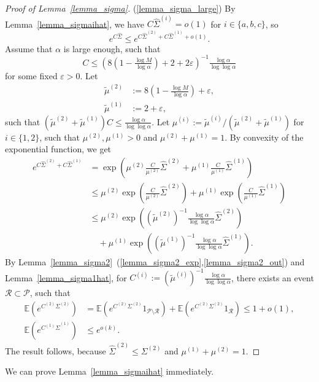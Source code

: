 \documentclass{article}
\theoremstyle{plain}
\theoremstyle{remark}
\theoremstyle{plain}
\numberwithin{equation}{section}
\begin{document}
\begin{proof}[Proof of Lemma~\ref{lemma_sigma}]
		(\ref{lemma_sigma_large}) By Lemma~\ref{lemma_sigmaihat}, we have $C\hat{\Sigma}^{(i)}=o(1)$ for $i\in\{a,b,c\}$, so $$e^{C\hat{\Sigma}}\leq e^{C\hat{\Sigma}^{(2)}+C\hat{\Sigma}^{(1)}+o(1)}.$$ Assume that $\alpha$ is large enough, such that $$C\leq\left(8\left(1-\tfrac{\log M}{\log\alpha}\right)+2+2\varepsilon\right)^{-1}\tfrac{\log\alpha}{\log\log\alpha}$$ for some fixed $\varepsilon>0$. Let
		\begin{align}
			\widetilde{\mu}^{(2)}&:=8\left(1-\tfrac{\log M}{\log\alpha}\right)+\varepsilon,
			\\\widetilde{\mu}^{(1)}&:=2+\varepsilon,
		\end{align}
		such that $(\widetilde{\mu}^{(2)}+\widetilde{\mu}^{(1)})C\leq\tfrac{\log\alpha}{\log\log\alpha}$. Let $\mu^{(i)}:=\widetilde{\mu}^{(i)}/(\widetilde{\mu}^{(2)}+\widetilde{\mu}^{(1)})$ for $i\in\{1,2\}$, such that $\mu^{(2)},\mu^{(1)}>0$ and $\mu^{(2)}+\mu^{(1)}=1$. By convexity of the exponential function, we get
		\begin{align}
			e^{C\hat{\Sigma}^{(2)}+C\hat{\Sigma}^{(1)}}
			&=\exp\left(\mu^{(2)}\tfrac{C}{\mu^{(2)}}\hat{\Sigma}^{(2)}+\mu^{(1)}\tfrac{C}{\mu^{(1)}}\hat{\Sigma}^{(1)}\right)
			\\&\leq\mu^{(2)}\exp\left(\tfrac{C}{\mu^{(2)}}\hat{\Sigma}^{(2)}\right)+\mu^{(1)}\exp\left(\tfrac{C}{\mu^{(1)}}\hat{\Sigma}^{(1)}\right)
			\\&\leq\mu^{(2)}\exp\left((\widetilde{\mu}^{(2)})^{-1}\tfrac{\log\alpha}{\log\log\alpha}\hat{\Sigma}^{(2)}\right)
			\\&\quad+\mu^{(1)}\exp\left((\widetilde{\mu}^{(1)})^{-1}\tfrac{\log\alpha}{\log\log\alpha}\hat{\Sigma}^{(1)}\right).
		\end{align}
		By Lemma~\ref{lemma_sigma2}~(\ref{lemma_sigma2_exp},\ref{lemma_sigma2_out}) and Lemma~\ref{lemma_sigma1hat}, for $C^{(i)}:=(\widetilde{\mu}^{(i)})^{-1}\tfrac{\log\alpha}{\log\log\alpha}$, there exists an event $\mathcal{R}\subset\mathcal{P}$, such that
		\begin{align}
			\mathbb{E}(e^{C^{(2)}\Sigma^{(2)}})&=\mathbb{E}(e^{C^{(2)}\Sigma^{(2)}}1_{\mathcal{P}\setminus\mathcal{R}})+\mathbb{E}(e^{C^{(2)}\Sigma^{(2)}}1_{\mathcal{R}})\leq1+o(1),
			\\\mathbb{E}(e^{C^{(1)}\hat{\Sigma}^{(1)}})&\leq e^{o(k)}.
		\end{align}
		The result follows, because $\hat{\Sigma}^{(2)}\leq\Sigma^{(2)}$ and $\mu^{(1)}+\mu^{(2)}=1$.
	\end{proof}
	
	We can prove Lemma~\ref{lemma_sigmaihat} immediately.
	
\end{document}
